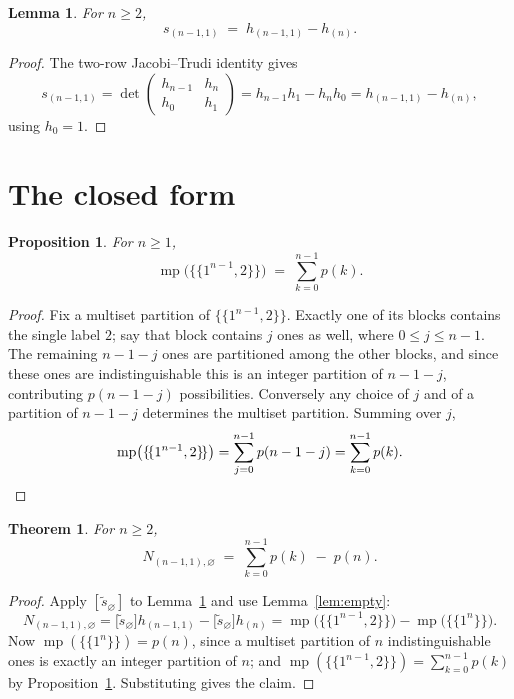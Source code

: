 \documentclass[11pt]{article}
\newtheorem{theorem}{Theorem}
\newtheorem{proposition}{Proposition}
\newtheorem{lemma}{Lemma}
\theoremstyle{remark}
\DeclareMathOperator{\msp}{mp}
\newcommand{\stil}{\widetilde{s}}
\newcommand{\ones}[1]{1^{#1}}
\begin{document}
\begin{lemma}\label{lem:jt}
For $n\ge 2$,
\[
  s_{(n-1,1)} \;=\; h_{(n-1,1)} - h_{(n)}.
\]
\end{lemma}

\begin{proof}
The two-row Jacobi--Trudi identity gives
\[
  s_{(n-1,1)}
  = \det\begin{pmatrix} h_{n-1} & h_{n}\\ h_{0} & h_{1}\end{pmatrix}
  = h_{n-1}h_{1} - h_{n}h_{0}
  = h_{(n-1,1)} - h_{(n)},
\]
using $h_0=1$.
\end{proof}

\section{The closed form}

\begin{proposition}\label{prop:count}
For $n\ge 1$,
\[
  \msp\bigl(\{\!\{\ones{n-1},2\}\!\}\bigr) \;=\; \sum_{k=0}^{n-1} p(k).
\]
\end{proposition}

\begin{proof}
Fix a multiset partition of $\{\!\{\ones{n-1},2\}\!\}$. Exactly one of its blocks
contains the single label $2$; say that block contains $j$ ones as well, where
$0\le j\le n-1$. The remaining $n-1-j$ ones are partitioned among the other
blocks, and since these ones are indistinguishable this is an integer partition
of $n-1-j$, contributing $p(n-1-j)$ possibilities. Conversely any choice of $j$
and of a partition of $n-1-j$ determines the multiset partition. Summing over
$j$,
\[
  \msp\bigl(\{\!\{\ones{n-1},2\}\!\}\bigr)
  = \sum_{j=0}^{n-1} p(n-1-j)
  = \sum_{k=0}^{n-1} p(k). \qedhere
\]
\end{proof}

\begin{theorem}\label{thm:formula}
For $n\ge 2$,
\[
  N_{(n-1,1),\varnothing} \;=\; \sum_{k=0}^{n-1} p(k)\;-\;p(n).
\]
\end{theorem}

\begin{proof}
Apply $[\stil_\varnothing]$ to Lemma~\ref{lem:jt} and use Lemma~\ref{lem:empty}:
\[
  N_{(n-1,1),\varnothing}
  = \bigl[\stil_\varnothing\bigr]h_{(n-1,1)} - \bigl[\stil_\varnothing\bigr]h_{(n)}
  = \msp\bigl(\{\!\{\ones{n-1},2\}\!\}\bigr) - \msp\bigl(\{\!\{\ones{n}\}\!\}\bigr).
\]
Now $\msp(\{\!\{\ones{n}\}\!\})=p(n)$, since a multiset partition of $n$
indistinguishable ones is exactly an integer partition of $n$; and
$\msp(\{\!\{\ones{n-1},2\}\!\})=\sum_{k=0}^{n-1}p(k)$ by
Proposition~\ref{prop:count}. Substituting gives the claim.
\end{proof}
\end{document}
